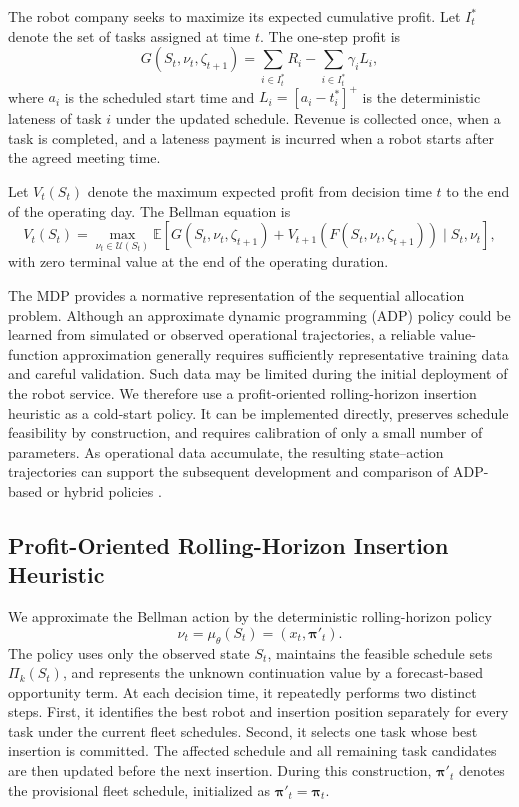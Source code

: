\documentclass[11pt,oneside]{article}
\begin{document}
The robot company seeks to maximize its expected cumulative profit. Let
\(I_t^*\) denote the set of tasks assigned at time \(t\). The one-step profit
is
\[
G(S_t,\nu_t,\zeta_{t+1})
=
\sum_{i\in I_t^{*}}R_i
-
\sum_{i\in I_t^{*}}\gamma_iL_i,
\]
where \(a_i\) is the scheduled start time and
\(L_i=[a_i-t_i^*]^+\) is the deterministic lateness of task \(i\) under the
updated schedule. Revenue is collected once, when a task is completed, and a lateness payment is
incurred when a robot starts after the agreed meeting time.

Let \(V_t(S_t)\) denote the maximum expected profit from decision time \(t\) to
the end of the operating day. The Bellman equation is
\[
V_t(S_t)
=
\max_{\nu_t\in\mathcal U(S_t)}
\mathbb E
\left[
G(S_t,\nu_t,\zeta_{t+1})
+V_{t+1}\!\left(F(S_t,\nu_t,\zeta_{t+1})\right)
\mid S_t,\nu_t
\right],
\]
with zero terminal value at the end of the operating duration.


The MDP provides a normative representation of the sequential allocation
problem. Although an approximate dynamic programming (ADP) policy could be
learned from simulated or observed operational trajectories, a reliable
value-function approximation generally requires sufficiently representative
training data and careful validation. Such data may be limited during the
initial deployment of the robot service. We therefore use a profit-oriented
rolling-horizon insertion heuristic as a cold-start policy. It can be
implemented directly, preserves schedule feasibility by construction, and
requires calibration of only a small number of parameters. As operational
data accumulate, the resulting state--action trajectories can support the
subsequent development and comparison of ADP-based or hybrid policies \citep{bertsekas1997rollout,auad2026data}.

\subsection{Profit-Oriented Rolling-Horizon Insertion Heuristic}\label{subsec:heuristic}

We approximate the Bellman action by the deterministic rolling-horizon policy
\[
\nu_t=\mu_\theta(S_t)=(x_t,\boldsymbol{\pi}'_t).
\]
The policy uses only the observed state \(S_t\), maintains the feasible
schedule sets \(\Pi_k(S_t)\), and represents the unknown continuation value
by a forecast-based opportunity term. At each decision time, it repeatedly
performs two distinct steps. First, it identifies the best robot and insertion
position separately for every task under the current fleet schedules. Second,
it selects one task whose best insertion is committed. The affected schedule
and all remaining task candidates are then updated before the next insertion.
During this construction, \(\boldsymbol{\pi}'_t\) denotes the provisional
fleet schedule, initialized as \(\boldsymbol{\pi}'_t=\boldsymbol{\pi}_t\).
\end{document}
